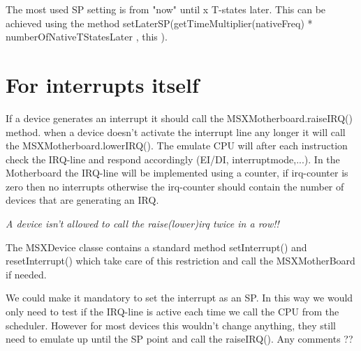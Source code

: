 \documentclass[11pt, a4paper]{report}
\begin{document}
The most used SP setting is from "now" until x T-states later. This can be
achieved using the method setLaterSP(getTimeMultiplier(nativeFreq) *
numberOfNativeTStatesLater , this ).


\section{For interrupts itself}

If a device generates an interrupt it should call the
MSXMotherboard.raiseIRQ() method. when a device doesn't activate
the interrupt line any longer it will call the
MSXMotherboard.lowerIRQ(). The emulate CPU will after each
instruction check the IRQ-line and respond accordingly (EI/DI,
interruptmode,...).  In the Motherboard the IRQ-line will be
implemented using a counter, if irq-counter is zero then no
interrupts otherwise the irq-counter should contain the number of
devices that are generating an IRQ.

\emph{A device isn't allowed to call the raise(lower)irq twice in a row!!}

The MSXDevice classe contains a standard method setInterrupt() and
resetInterrupt() which take care of this restriction and call the
MSXMotherBoard if needed.

We could make it mandatory to set the interrupt as an SP. In this way we
would only need to test if the IRQ-line is active each time we call the
CPU from the scheduler. However for most devices this wouldn't change
anything, they still need to emulate up until the SP point and call the
raiseIRQ(). Any comments ??
\end{document}
